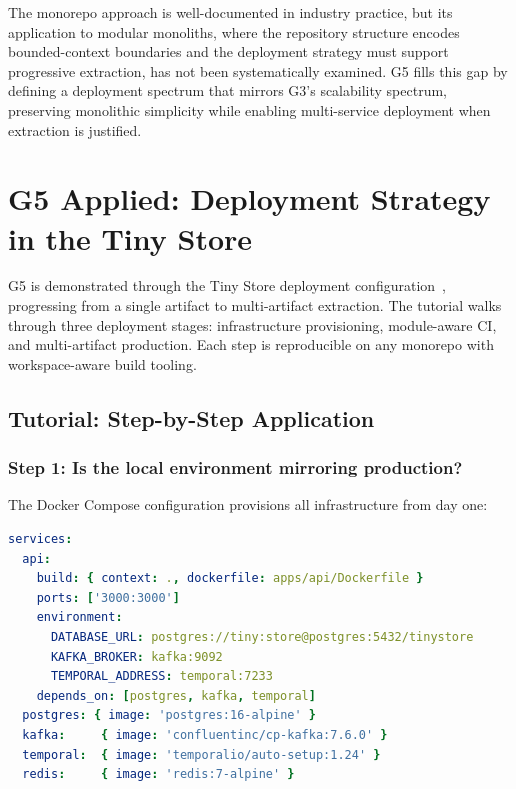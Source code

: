 The monorepo approach is well-documented in industry practice, but its application to modular monoliths, where the repository structure encodes bounded-context boundaries and the deployment strategy must support progressive extraction, has not been systematically examined. G5 fills this gap by defining a deployment spectrum that mirrors G3's scalability spectrum, preserving monolithic simplicity while enabling multi-service deployment when extraction is justified.


\section*{G5 Applied: Deployment Strategy in the Tiny Store}
\label{sec:g5-applied}

G5 is demonstrated through the Tiny Store deployment configuration~\cite{tinystore2026}, progressing from a single artifact to multi-artifact extraction. The tutorial walks through three deployment stages: infrastructure provisioning, module-aware CI, and multi-artifact production. Each step is reproducible on any monorepo with workspace-aware build tooling.

\subsection*{Tutorial: Step-by-Step Application}

\subsubsection*{Step 1: Is the local environment mirroring production?}

The Docker Compose configuration provisions all infrastructure from day one:

\begin{lstlisting}[basicstyle=\ttfamily\scriptsize,language=yaml,caption={Docker Compose: infrastructure from day one (abbreviated)},label={lst:g5-docker-compose}]
services:
  api:
    build: { context: ., dockerfile: apps/api/Dockerfile }
    ports: ['3000:3000']
    environment:
      DATABASE_URL: postgres://tiny:store@postgres:5432/tinystore
      KAFKA_BROKER: kafka:9092
      TEMPORAL_ADDRESS: temporal:7233
    depends_on: [postgres, kafka, temporal]
  postgres: { image: 'postgres:16-alpine' }
  kafka:     { image: 'confluentinc/cp-kafka:7.6.0' }
  temporal:  { image: 'temporalio/auto-setup:1.24' }
  redis:     { image: 'redis:7-alpine' }
\end{lstlisting}

